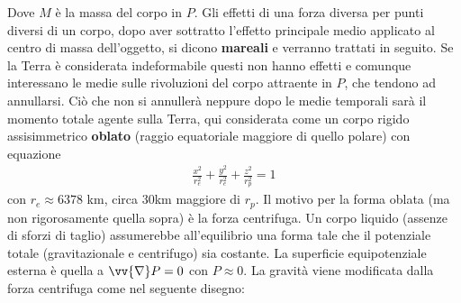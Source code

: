 \documentclass[a4paper, oneside]{book}
\begin{document}
Dove $M$ è la massa del corpo in $P$.
 Gli effetti di una forza diversa per punti diversi di un corpo, dopo aver sottratto l'effetto principale medio applicato al centro di massa dell'oggetto, si dicono \textbf{mareali} e verranno trattati in seguito.
 Se la Terra è considerata indeformabile questi non hanno effetti e comunque interessano le medie sulle rivoluzioni del corpo attraente in $P$, che tendono ad annullarsi.
 Ciò che non si annullerà neppure dopo le medie temporali sarà il momento totale agente sulla Terra, qui considerata come un corpo rigido assisimmetrico \textbf{oblato}
 (raggio equatoriale maggiore di quello polare) con equazione
 \begin{gather*}
    \frac{x^2}{r_e^2} + \frac{y^2}{r_e^2} + \frac{z^2}{r_p^2}=1
 \end{gather*}
 con $r_e\approx6378$ km, circa 30km maggiore di $r_p$. Il motivo per la forma oblata (ma non rigorosamente quella sopra) è la forza centrifuga. Un corpo liquido (assenze di sforzi di taglio) assumerebbe all'equilibrio una forma tale che il potenziale totale (gravitazionale e centrifugo) sia costante.
 La superficie equipotenziale esterna è quella a $\vv{\nabla}P=0$ con $P\approx0$. La gravità viene modificata dalla forza centrifuga 
come nel seguente disegno:
\end{document}
